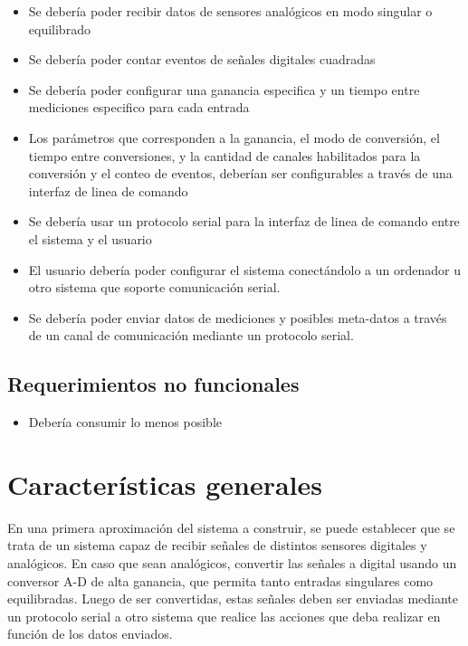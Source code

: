 \begin{itemize}
	\item Se debería poder recibir datos de sensores analógicos en modo singular o equilibrado
	\item Se debería poder contar eventos de señales digitales cuadradas
	\item Se debería poder configurar una ganancia especifica y un tiempo entre mediciones especifico para cada entrada
	\item Los parámetros que corresponden a la ganancia, el modo de conversión, el tiempo entre conversiones, y la cantidad de canales habilitados para la conversión y el conteo de eventos, deberían ser configurables a través de una interfaz de linea de comando
	\item Se debería usar un protocolo serial para la interfaz de linea de comando entre el sistema y el usuario
	\item El usuario debería poder configurar el sistema conectándolo a un ordenador u otro sistema que soporte comunicación serial.
	\item Se debería poder enviar datos de mediciones y posibles meta-datos a través de un canal de comunicación mediante un protocolo serial.
\end{itemize}


\subsection{Requerimientos no funcionales} %
\label{sub:requerimientos_no_funcionales}

\begin{itemize}
	\item Debería consumir lo menos posible
\end{itemize}



\section{Características generales} %
\label{sec:caracteristicas_generales}

En una primera aproximación del sistema a construir, se puede establecer que se trata de un sistema capaz de recibir señales de distintos sensores digitales y analógicos. En caso que sean analógicos, convertir las señales a digital usando un conversor A-D de alta ganancia, que permita tanto entradas singulares como equilibradas. Luego de ser convertidas, estas señales deben ser enviadas mediante un protocolo serial a otro sistema que realice las acciones que deba realizar en función de los datos enviados.

